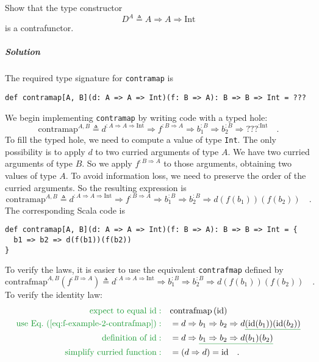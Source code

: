 Show that the type constructor 
\[
D^{A}\triangleq A\Rightarrow A\Rightarrow\text{Int}
\]
is a contrafunctor.

\subparagraph{Solution}

The required type signature for \lstinline!contramap! is
\begin{lstlisting}
def contramap[A, B](d: A => A => Int)(f: B => A): B => B => Int = ???
\end{lstlisting}
We begin implementing \lstinline!contramap! by writing code with
a typed hole:
\[
\text{contramap}^{A,B}\triangleq d^{:A\Rightarrow A\Rightarrow\text{Int}}\Rightarrow f^{:B\Rightarrow A}\Rightarrow b_{1}^{:B}\Rightarrow b_{2}^{:B}\Rightarrow\text{???}^{:\text{Int}}\quad.
\]
To fill the typed hole, we need to compute a value of type \lstinline!Int!.
The only possibility is to apply $d$ to two curried arguments of
type $A$. We have two curried arguments of type $B$. So we apply
$f^{:B\Rightarrow A}$ to those arguments, obtaining two values of
type $A$. To avoid information loss, we need to preserve the order
of the curried arguments. So the resulting expression is
\[
\text{contramap}^{A,B}\triangleq d^{:A\Rightarrow A\Rightarrow\text{Int}}\Rightarrow f^{:B\Rightarrow A}\Rightarrow b_{1}^{:B}\Rightarrow b_{2}^{:B}\Rightarrow d\left(f(b_{1})\right)\left(f(b_{2})\right)\quad.
\]
The corresponding Scala code is 
\begin{lstlisting}
def contramap[A, B](d: A => A => Int)(f: B => A): B => B => Int = {
  b1 => b2 => d(f(b1))(f(b2))
}
\end{lstlisting}
To verify the laws, it is easier to use the equivalent \lstinline!contrafmap!
defined by
\begin{equation}
\text{contrafmap}^{A,B}(f^{:B\Rightarrow A})\triangleq d^{:A\Rightarrow A\Rightarrow\text{Int}}\Rightarrow b_{1}^{:B}\Rightarrow b_{2}^{:B}\Rightarrow d\left(f(b_{1})\right)\left(f(b_{2})\right)\quad.\label{eq:f-example-2-contrafmap}
\end{equation}
To verify the identity law:
\begin{align*}
{\color{greenunder}\text{expect to equal }\text{id}:}\quad & \text{contrafmap}\left(\text{id}\right)\\
{\color{greenunder}\text{use Eq.~(\ref{eq:f-example-2-contrafmap})}:}\quad & =d\Rightarrow b_{1}\Rightarrow b_{2}\Rightarrow d\gunderline{\left(\text{id}(b_{1})\right)}\gunderline{\left(\text{id}(b_{2})\right)}\\
{\color{greenunder}\text{definition of }\text{id}:}\quad & =d\Rightarrow\gunderline{b_{1}\Rightarrow b_{2}\Rightarrow d(b_{1})(b_{2})}\\
{\color{greenunder}\text{simplify curried function}:}\quad & =\left(d\Rightarrow d\right)=\text{id}\quad.
\end{align*}
